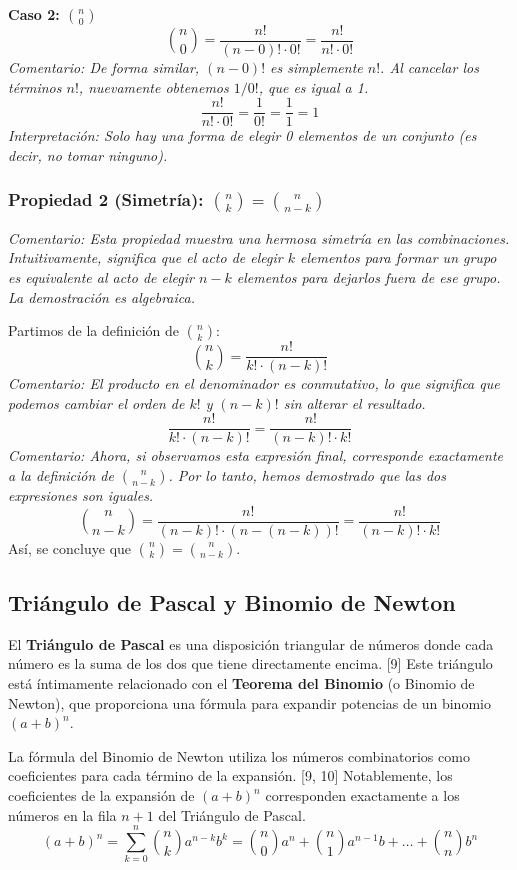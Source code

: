\documentclass[12pt, letterpaper]{article}
\begin{document}
\vspace{1em}
\noindent \textbf{Caso 2: $\binom{n}{0}$}
\[ \binom{n}{0} = \frac{n!}{(n-0)! \cdot 0!} = \frac{n!}{n! \cdot 0!} \]
\textit{Comentario: De forma similar, $(n-0)!$ es simplemente $n!$. Al cancelar los términos $n!$, nuevamente obtenemos $1/0!$, que es igual a 1.}
\[ \frac{n!}{n! \cdot 0!} = \frac{1}{0!} = \frac{1}{1} = 1 \]
\textit{Interpretación: Solo hay una forma de elegir 0 elementos de un conjunto (es decir, no tomar ninguno).}

\subsubsection{Propiedad 2 (Simetría): $\binom{n}{k} = \binom{n}{n-k}$}
\textit{Comentario: Esta propiedad muestra una hermosa simetría en las combinaciones. Intuitivamente, significa que el acto de elegir $k$ elementos para formar un grupo es equivalente al acto de elegir $n-k$ elementos para dejarlos fuera de ese grupo. La demostración es algebraica.}

\vspace{1em}
\noindent Partimos de la definición de $\binom{n}{k}$:
\[ \binom{n}{k} = \frac{n!}{k! \cdot (n-k)!} \]
\textit{Comentario: El producto en el denominador es conmutativo, lo que significa que podemos cambiar el orden de $k!$ y $(n-k)!$ sin alterar el resultado.}
\[ \frac{n!}{k! \cdot (n-k)!} = \frac{n!}{(n-k)! \cdot k!} \]
\textit{Comentario: Ahora, si observamos esta expresión final, corresponde exactamente a la definición de $\binom{n}{n-k}$. Por lo tanto, hemos demostrado que las dos expresiones son iguales.}
\[ \binom{n}{n-k} = \frac{n!}{(n-k)! \cdot (n-(n-k))!} = \frac{n!}{(n-k)! \cdot k!} \]
Así, se concluye que $\binom{n}{k} = \binom{n}{n-k}$.

\subsection{Triángulo de Pascal y Binomio de Newton}
El \textbf{Triángulo de Pascal} es una disposición triangular de números donde cada número es la suma de los dos que tiene directamente encima. [9] Este triángulo está íntimamente relacionado con el \textbf{Teorema del Binomio} (o Binomio de Newton), que proporciona una fórmula para expandir potencias de un binomio $(a+b)^n$.

La fórmula del Binomio de Newton utiliza los números combinatorios como coeficientes para cada término de la expansión. [9, 10] Notablemente, los coeficientes de la expansión de $(a+b)^n$ corresponden exactamente a los números en la fila $n+1$ del Triángulo de Pascal.
\[ (a+b)^n = \sum_{k=0}^{n} \binom{n}{k} a^{n-k} b^k = \binom{n}{0}a^n + \binom{n}{1}a^{n-1}b + \dots + \binom{n}{n}b^n \]
\end{document}
